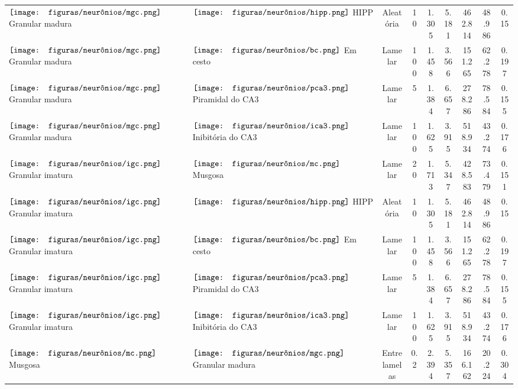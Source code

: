 \begin{table}[h!]
{\begin{tabular}{llccccccc}
$\vcenter{\hbox{\texttt{[image: figuras/neurônios/mgc.png]}}}$ Granular madura & $\vcenter{\hbox{\texttt{[image: figuras/neurônios/hipp.png]}}}$ HIPP & Aleatória & 10 & 1.305 & 5.181 & 462.814 & 48.986 & 0.15 \\
$\vcenter{\hbox{\texttt{[image: figuras/neurônios/mgc.png]}}}$ Granular madura & $\vcenter{\hbox{\texttt{[image: figuras/neurônios/bc.png]}}}$ Em cesto & Lamelar & 100 & 1.458 & 3.566 & 151.265 & 62.278 & 0.197 \\
$\vcenter{\hbox{\texttt{[image: figuras/neurônios/mgc.png]}}}$ Granular madura & $\vcenter{\hbox{\texttt{[image: figuras/neurônios/pca3.png]}}}$ Piramidal do CA3 & Lamelar & 5 & 1.384 & 6.657 & 278.286 & 78.584 & 0.155 \\
$\vcenter{\hbox{\texttt{[image: figuras/neurônios/mgc.png]}}}$ Granular madura & $\vcenter{\hbox{\texttt{[image: figuras/neurônios/ica3.png]}}}$ Inibitória do CA3 & Lamelar & 100 & 1.625 & 3.915 & 518.934 & 43.274 & 0.176 \\
$\vcenter{\hbox{\texttt{[image: figuras/neurônios/igc.png]}}}$ Granular imatura & $\vcenter{\hbox{\texttt{[image: figuras/neurônios/mc.png]}}}$ Musgosa & Lamelar & 20 & 1.713 & 5.347 & 428.583 & 73.479 & 0.151 \\
$\vcenter{\hbox{\texttt{[image: figuras/neurônios/igc.png]}}}$ Granular imatura & $\vcenter{\hbox{\texttt{[image: figuras/neurônios/hipp.png]}}}$ HIPP & Aleatória & 10 & 1.305 & 5.181 & 462.814 & 48.986 & 0.15 \\
$\vcenter{\hbox{\texttt{[image: figuras/neurônios/igc.png]}}}$ Granular imatura & $\vcenter{\hbox{\texttt{[image: figuras/neurônios/bc.png]}}}$ Em cesto & Lamelar & 100 & 1.458 & 3.566 & 151.265 & 62.278 & 0.197 \\
$\vcenter{\hbox{\texttt{[image: figuras/neurônios/igc.png]}}}$ Granular imatura & $\vcenter{\hbox{\texttt{[image: figuras/neurônios/pca3.png]}}}$ Piramidal do CA3 & Lamelar & 5 & 1.384 & 6.657 & 278.286 & 78.584 & 0.155 \\
$\vcenter{\hbox{\texttt{[image: figuras/neurônios/igc.png]}}}$ Granular imatura & $\vcenter{\hbox{\texttt{[image: figuras/neurônios/ica3.png]}}}$ Inibitória do CA3 & Lamelar & 100 & 1.625 & 3.915 & 518.934 & 43.274 & 0.176 \\
$\vcenter{\hbox{\texttt{[image: figuras/neurônios/mc.png]}}}$ Musgosa & $\vcenter{\hbox{\texttt{[image: figuras/neurônios/mgc.png]}}}$ Granular madura & Entre lamelas & 0.2 & 2.394 & 5.357 & 166.162 & 20.224 & 0.304 \\

\end{tabular}}
\end{table}
